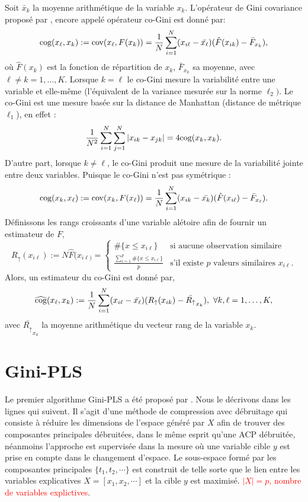 Soit $\bar{x}_k$ la moyenne arithmétique de la variable $x_k$. L'opérateur de Gini covariance proposé par \citet{Schechtman03}, encore appelé opérateur co-Gini est donné par:
\begin{equation}\label{cog0}
\text{cog}(x_\ell,x_k) := \text{cov}(x_\ell,F(x_k)) = \frac{1}{N}\sum_{i=1}^N(x_{i\ell} -\bar{x_\ell})(\hat{F}(x_{ik})-\bar{F}_{x_k}),
\end{equation}
où $\hat{F}(x_{k})$ est la fonction de répartition de $x_k$, $\bar{F}_{x_k}$ sa moyenne, avec $\ell \neq k = 1,\ldots,K$. Lorsque $k=\ell$ le co-Gini mesure la variabilité entre une variable et elle-même (l'équivalent de la variance mesurée sur la norme $\ell_2)$. Le co-Gini est une mesure basée sur la distance de Manhattan (distance de métrique $\ell_1$), en effet :
\begin{equation}\notag
\frac{1}{N^2}\sum_{i=1}^N\sum_{j=1}^N |x_{ik} - x_{jk}| = 4\text{cog}(x_k,x_k).
\end{equation}
D'autre part, lorsque $k\neq \ell$, le co-Gini produit une mesure de la variabilité jointe entre deux variables. Puisque le co-Gini n'est pas symétrique :
\[
\text{cog}(x_k,x_\ell) := \text{cov}(x_k ,F(x_\ell)) = \frac{1}{N}\sum_{i=1}^N(x_{ik} -\bar{x_k})(\hat{F}(x_{i\ell})-\bar{F}_{x_\ell}).
\]
Définissons les rangs croissants d'une variable alétoire afin de fournir un estimateur de $F$,
\[
R_\uparrow(x_{i\ell}) := N\hat{F}(x_{i\ell)} = 
\left\{ \begin{array}{ll}
\#\{ x \leq x_{i\ell} \} & \text{si aucune observation similaire} \\
\frac{\sum_{i=1}^p\#\{ x \leq x_{i\ell}  \}}{p} & \text{s'il existe $p$ valeurs similaires $x_{i\ell}$.}
\end{array}
\right.
\]
Alors, un estimateur du co-Gini est donné par,
\begin{eqnarray}\label{cog}
\widehat{\text{cog}}(x_\ell,x_k) := \frac{1}{N}\sum_{i=1}^N(x_{i\ell} -\bar{x_\ell})(R_\uparrow(x_{ik})-\bar{R_\uparrow}_{x_k}), \ \forall k,\ell=1,\ldots,K,
\end{eqnarray}
avec $\bar{R_\uparrow}_{x_k}$ la moyenne arithmétique du vecteur rang de la variable $x_k$. 


\section{Gini-PLS}

Le premier algorithme Gini-PLS a été proposé par \citet{mussard2018ginipls}. Nous le décrivons dans les lignes qui suivent. Il s'agit d'une méthode de compression avec débruitage qui consiste à réduire les dimensions de l'espace généré par $X$ afin de trouver des composantes principales débruitées, dans le même esprit qu'une ACP débruitée, néanmoins l'approche est supervisée dans la mesure où une variable cible $y$ est prise en compte dans le changement d'espace. Le sous-espace formé par les composantes principales $\{t_1,t_2,\cdots\}$ est construit de telle sorte que le lien entre les variables explicatives $X = [x_1,x_2,\cdots]$ et la cible $y$ est maximisé.  \textcolor{red}{$\vert X \vert = p$, nombre de variables explictives}.

